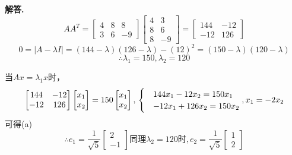 \documentclass[12pt, a4paper, oneside]{ctexart}
\newenvironment{solution}{\par\noindent\textbf{解答. }}{\par}
\begin{document}
\begin{solution}
    $$
    AA^T=
    \begin{bmatrix}
        4 & 8 & 8 \\
        3 & 6 & -9
        \end{bmatrix}
        \begin{bmatrix}
            4 & 3 \\
            8 & 6\\
            8&-9
            \end{bmatrix}
            =    \begin{bmatrix}
                144 & -12\\
                -12 & 126
                \end{bmatrix}
    $$
    $$
    0=|A-\lambda I|=(144-\lambda)(126-\lambda)-(12)^2=(150-\lambda)(120-\lambda)
    $$
    $$
    \therefore \lambda_1=150,\lambda_2=120
    $$

    当$Ax=\lambda_1 x$时，
$$
\begin{bmatrix}
144 & -12\\
-12 & 126
\end{bmatrix}
\begin{bmatrix}
x_1\\
x_2
\end{bmatrix}=150
\begin{bmatrix}
x_1\\
x_2
\end{bmatrix},\\
\begin{cases}
    &144x_1-12x_2=150x_1\\
    &-12x_1+126x_2=150x_2
\end{cases},\\
x_1=-2x_2
$$
可得(a)
$$
\therefore e_1= \frac{1}{\sqrt{5}}\begin{bmatrix}
    2\\
    -1
    \end{bmatrix}
\text{同理}\lambda_2=120\text{时},e_2= \frac{1}{\sqrt{5}}\begin{bmatrix}
    1\\
    2
    \end{bmatrix}
$$


\end{solution}
\end{document}
